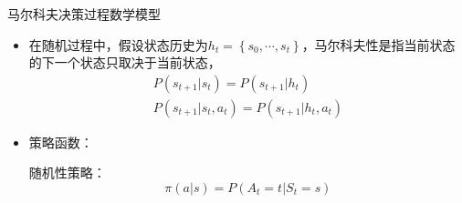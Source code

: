 \begin{note}
    马尔科夫决策过程数学模型
    \begin{itemize}
        \item 在随机过程中，假设状态历史为$h_t = \left\{ s_0,\cdots,s_t \right\}$，马尔科夫性是指当前状态的下一个状态只取决于当前状态，
        \[
            \begin{array}{l}
                P\left( s_{t+1}|s_t \right) = P\left( s_{t+1}|h_{t} \right)\\
                P\left( s_{t+1}|s_t,a_t \right) = P\left( s_{t+1}|h_{t},a_{t} \right)
            \end{array}
        \]
        \item 策略函数：
        
        随机性策略：
        \[
            \pi\left( a|s \right) =P\left( A_t =t|S_t = s \right)
        \]


\end{itemize}
\end{note}
